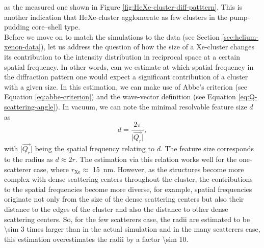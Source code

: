 as the measured one shown in Figure \ref{fig:HeXe-cluster-diff-patttern}. This is another indication that HeXe-cluster agglomerate as few clusters in the pump-pudding core--shell type.\\[1\baselineskip]
%
Before we move on to match the simulations to the data (see Section \ref{sec:helium-xenon-data}), let us address the question of how the size of a Xe-cluster changes its contribution to the intensity distribution in reciprocal space at a certain spatial frequency. In other words, can we estimate at which spatial frequency in the diffraction pattern one would expect a significant contribution of a cluster with a given size. In this estimation, we can make use of Abbe's criterion (see Equation \eqref{eq:abbe-criterion}) and the wave-vector definition (see Equation \eqref{eq:Q-scattering-angle}). In vacuum, we can note the minimal resolvable feature size $d$ as
\begin{equation}
d = \frac{2\pi}{\lvert\vec{Q_{r}}\rvert},
\label{eq:diameter-estimate}
\end{equation}
with $\lvert\vec{Q_{r}}\rvert$ being the spatial frequency relating to $d$. The feature size corresponds to the radius as $d\approx 2 r$. The estimation via this relation works well for the one-scatterer case, where $r_{\text{Xe}}\approx$ \SI{15}{\nano\meter}. However, as the structures become more complex with dense scattering centers throughout the cluster, the contributions to the spatial frequencies become more diverse, for example, spatial frequencies originate not only from the size of the dense scattering centers but also their distance to the edges of the cluster and also the distance to other dense scattering centers. So, for the few scatterers case, the radii are estimated to be \num{\sim 3} times larger than in the actual simulation and in the many scatterers case, this estimation overestimates the radii by a factor \num{\sim 10}.\\[1\baselineskip]
%
